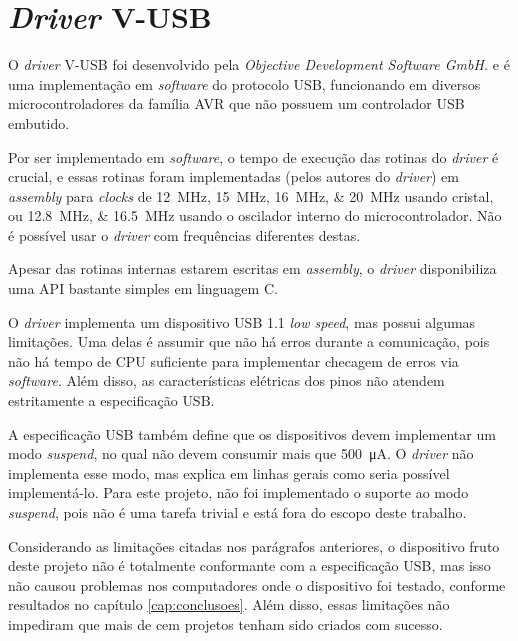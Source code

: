 \documentclass[brazil,pagestart=firstchapter]{abnt}
\newcommand*{\VUSB}{\mbox{V-USB}\xspace}
\begin{document}
\section{\textit{Driver} \VUSB}
\label{sec:vusb}

O \textit{driver} \VUSB foi desenvolvido pela \textit{Objective Development
Software GmbH.} e é uma implementação em \textit{software} do protocolo
\ac{USB}, funcionando em diversos microcontroladores da família AVR que não
possuem um controlador \ac{USB} embutido. \cite{VUSBdriver}

Por ser implementado em \textit{software}, o tempo de execução das rotinas
do \textit{driver} é crucial, e essas rotinas foram implementadas (pelos
autores do \textit{driver}) em \textit{assembly} para \textit{clocks} de
\SIlist[list-final-separator={ ou }]{12; 15; 16; 20}{\mega\hertz} usando
cristal, ou \SIlist[list-final-separator={ ou }]{12.8; 16.5}{\mega\hertz}
usando o oscilador interno do microcontrolador. Não é possível usar o
\textit{driver} com frequências diferentes destas. \cite{VUSBdriver}

Apesar das rotinas internas estarem escritas em \textit{assembly}, o
\textit{driver} disponibiliza uma \ac{API} bastante simples em linguagem C.

O \textit{driver} implementa um dispositivo \ac{USB} 1.1 \textit{low speed},
mas possui algumas limitações. Uma delas é assumir que não há erros durante
a comunicação, pois não há tempo de CPU suficiente para implementar checagem
de erros via \textit{software}. Além disso, as características elétricas dos
pinos não atendem estritamente a especificação \ac{USB}. \cite{VUSBdriver}

A especificação \ac{USB} também define que os dispositivos devem implementar
um modo \textit{suspend}, no qual não devem consumir mais que
\SI{500}{\micro\ampere}. \cite[cap.~2]{usbinanutshell} O \textit{driver} não
implementa esse modo, mas explica em linhas gerais como seria possível
implementá-lo. \cite[usbdrv.h]{VUSBdriver} Para este projeto, não foi
implementado o suporte ao modo \textit{suspend}, pois não é uma tarefa
trivial e está fora do escopo deste trabalho.

Considerando as limitações citadas nos parágrafos anteriores, o dispositivo
fruto deste projeto não é totalmente conformante com a especificação
\ac{USB}, mas isso não causou problemas nos computadores onde o dispositivo
foi testado, conforme resultados no capítulo \ref{cap:conclusoes}. Além
disso, essas limitações não impediram que mais de cem projetos tenham sido
criados com sucesso. \cite{VUSBprojects}
\end{document}
